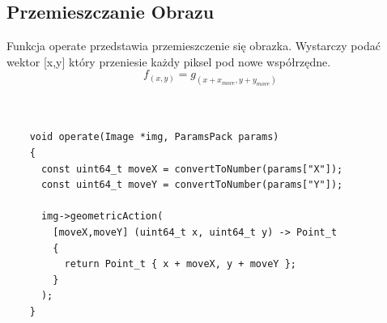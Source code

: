 \documentclass{article}
\begin{document}
\FloatBarrier
\subsection{Przemieszczanie Obrazu}
Funkcja operate przedstawia przemieszczenie się obrazka. Wystarczy podać wektor [x,y] który przeniesie każdy piksel pod nowe współrzędne.
\begin{equation*}
f_(x,y) = g_(x+x_{move},y+y_{move})
\end{equation*}\\
\begin{Verbatim}[frame=single,label=Przemieszczanie Obrazu (Source Code)]

    void operate(Image *img, ParamsPack params)
    {
      const uint64_t moveX = convertToNumber(params["X"]);
      const uint64_t moveY = convertToNumber(params["Y"]);

      img->geometricAction(
        [moveX,moveY] (uint64_t x, uint64_t y) -> Point_t
        {
          return Point_t { x + moveX, y + moveY };
        }
      );
    }
    
\end{Verbatim}
\end{document}

